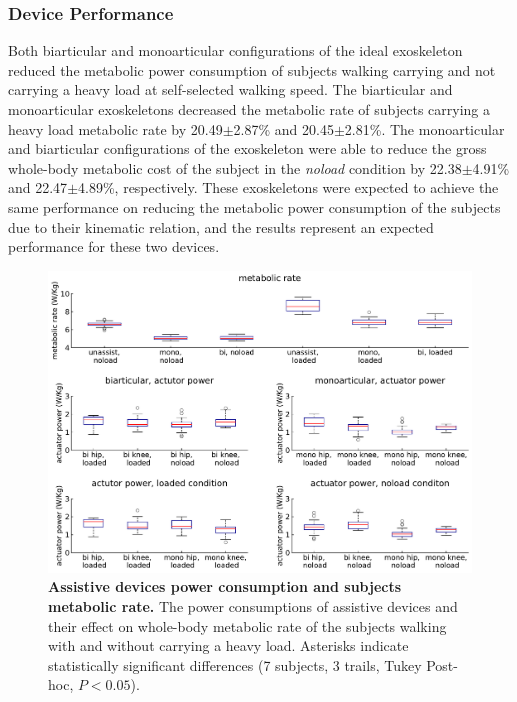 \documentclass[10pt,letterpaper]{article}
\begin{document}
\subsubsection*{Device Performance}
Both biarticular and monoarticular configurations of the ideal exoskeleton reduced the metabolic power consumption of subjects walking carrying and not carrying a heavy load at self-selected walking speed. The biarticular and monoarticular exoskeletons decreased the metabolic rate of subjects carrying a heavy load metabolic rate by 20.49$\pm$2.87\% and 20.45$\pm$2.81\%. The monoarticular and biarticular configurations of the exoskeleton were able to reduce the gross whole-body metabolic cost of the subject in the \textit{noload} condition by 22.38$\pm$4.91\% and 22.47$\pm$4.89\%, respectively. These exoskeletons were expected to achieve the same performance on reducing the metabolic power consumption of the subjects due to their kinematic relation, and the results represent an expected performance for these two devices.\\
\begin{figure}[ht]   
	\centering
	\includegraphics[width=\linewidth]{Ideal_Exo_MonovsBi_Figures/Paper_Figure_Energy_BoxPlot.pdf}
	\vspace{1mm}
	\caption{\small{\textbf{Assistive devices power consumption and subjects metabolic rate.} The power consumptions of assistive devices and their effect on whole-body metabolic rate of the subjects walking with and without carrying a heavy load. Asterisks indicate statistically significant differences (7 subjects, 3 trails, Tukey Post-hoc, $P < 0.05$).}}
	\label{Fig_IdealExo_Energy_BoxPlot}
\end{figure}
\end{document}
